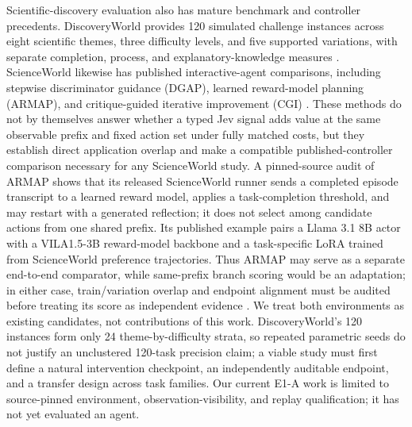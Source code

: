 \documentclass[11pt]{article}
\begin{document}
Scientific-discovery evaluation also has mature benchmark and controller precedents. DiscoveryWorld provides 120 simulated challenge instances across eight scientific themes, three difficulty levels, and five supported variations, with separate completion, process, and explanatory-knowledge measures \cite{discoveryworld}. ScienceWorld likewise has published interactive-agent comparisons, including stepwise discriminator guidance (DGAP), learned reward-model planning (ARMAP), and critique-guided iterative improvement (CGI) \cite{dgap,armap,cgi}. These methods do not by themselves answer whether a typed Jev signal adds value at the same observable prefix and fixed action set under fully matched costs, but they establish direct application overlap and make a compatible published-controller comparison necessary for any ScienceWorld study. A pinned-source audit of ARMAP shows that its released ScienceWorld runner sends a completed episode transcript to a learned reward model, applies a task-completion threshold, and may restart with a generated reflection; it does not select among candidate actions from one shared prefix. Its published example pairs a Llama 3.1 8B actor with a VILA1.5-3B reward-model backbone and a task-specific LoRA trained from ScienceWorld preference trajectories. Thus ARMAP may serve as a separate end-to-end comparator, while same-prefix branch scoring would be an adaptation; in either case, train/variation overlap and endpoint alignment must be audited before treating its score as independent evidence \cite{armapcode,armapmodel}. We treat both environments as existing candidates, not contributions of this work. DiscoveryWorld's 120 instances form only 24 theme-by-difficulty strata, so repeated parametric seeds do not justify an unclustered 120-task precision claim; a viable study must first define a natural intervention checkpoint, an independently auditable endpoint, and a transfer design across task families. Our current E1-A work is limited to source-pinned environment, observation-visibility, and replay qualification; it has not yet evaluated an agent.
\end{document}
